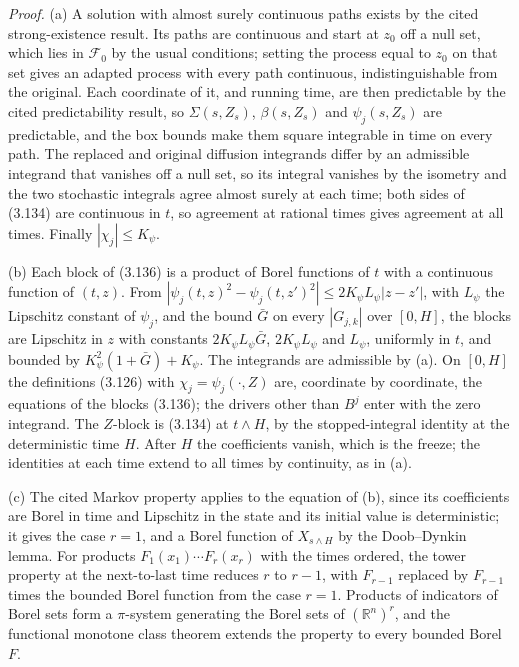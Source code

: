 \documentclass[11pt]{article}
\begin{document}
\emph{Proof.} (a) A solution with almost surely continuous paths exists by the cited strong-existence result. Its paths are continuous and start at \(z_0\) off a null set, which lies in \(\mathcal F_0\) by the usual conditions; setting the process equal to \(z_0\) on that set gives an adapted process with every path continuous, indistinguishable from the original. Each coordinate of it, and running time, are then predictable by the cited predictability result, so \(\Sigma(s,Z_s)\), \(\beta(s,Z_s)\) and \(\psi_j(s,Z_s)\) are predictable, and the box bounds make them square integrable in time on every path. The replaced and original diffusion integrands differ by an admissible integrand that vanishes off a null set, so its integral vanishes by the isometry and the two stochastic integrals agree almost surely at each time; both sides of (3.134) are continuous in \(t\), so agreement at rational times gives agreement at all times. Finally \(|\chi_j|\le K_\psi\).

(b) Each block of (3.136) is a product of Borel functions of \(t\) with a continuous function of \((t,z)\). From \(|\psi_j(t,z)^2-\psi_j(t,z')^2|\le2K_\psi L_\psi|z-z'|\), with \(L_\psi\) the Lipschitz constant of \(\psi_j\), and the bound \(\bar G\) on every \(|G_{j,k}|\) over \([0,H]\), the blocks are Lipschitz in \(z\) with constants \(2K_\psi L_\psi\bar G\), \(2K_\psi L_\psi\) and \(L_\psi\), uniformly in \(t\), and bounded by \(K_\psi^2(1+\bar G)+K_\psi\). The integrands are admissible by (a). On \([0,H]\) the definitions (3.126) with \(\chi_j=\psi_j(\cdot,Z)\) are, coordinate by coordinate, the equations of the blocks (3.136); the drivers other than \(B^j\) enter with the zero integrand. The \(Z\)-block is (3.134) at \(t\wedge H\), by the stopped-integral identity at the deterministic time \(H\). After \(H\) the coefficients vanish, which is the freeze; the identities at each time extend to all times by continuity, as in (a).

(c) The cited Markov property applies to the equation of (b), since its coefficients are Borel in time and Lipschitz in the state and its initial value is deterministic; it gives the case \(r=1\), and a Borel function of \(X_{s\wedge H}\) by the Doob--Dynkin lemma. For products \(F_1(x_1)\cdots F_r(x_r)\) with the times ordered, the tower property at the next-to-last time reduces \(r\) to \(r-1\), with \(F_{r-1}\) replaced by \(F_{r-1}\) times the bounded Borel function from the case \(r=1\). Products of indicators of Borel sets form a \(\pi\)-system generating the Borel sets of \((\mathbb R^n)^r\), and the functional monotone class theorem extends the property to every bounded Borel \(F\).
\end{document}
